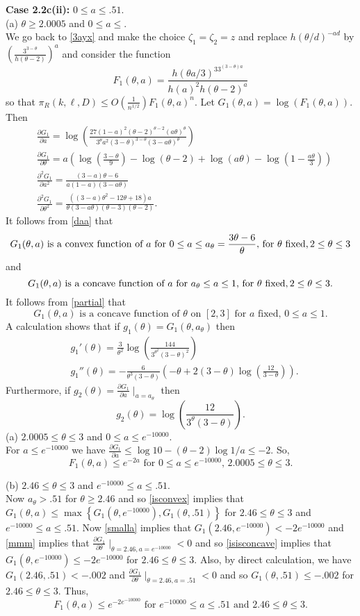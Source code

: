 \documentclass[11pt]{article}
\def\z{\zeta}
\def\th{\theta}
\def\p{\pi}
\newcommand{\set}[1]{\left\{#1\right\}}
\newcommand{\brac}[1]{\left(#1\right)}
\newcommand{\bfrac}[2]{\brac{\frac{#1}{#2}}}
\newcommand{\beq}[1]{\begin{equation}\label{#1}}
\newcommand{\eeq}{\end{equation}}
\begin{document}
{\bf Case 2.2c(ii):} $0\leq a\leq .51$.\\
(a) $\th\geq 2.0005$ and $0\leq a\leq $.\\
We go back to \eqref{3ayx} and make the choice $\z_1=\z_2=z$ and replace
$h(\th/d)^{-ad}$ by $\bfrac{3^{3-\th}}{h\brac{\th-2}}^a$ and 
consider the function 
$$F_1(\th,a)=\frac{h(\th a/3)^33^{(3-\th)a}}{h(a)^2h(\th-2)^a}$$
so that $\p_R(k,\ell,D)\leq O\bfrac{1}{n^{1/2}}F_1(\th,a)^n$. Let $G_1(\th,a)=\log(F_1(\th,a))$. Then
\begin{align}
&\frac{\partial G_1}{\partial a}=\log\bfrac{27(1-a)^2(\th-2)^{\th-2}(a\th)^\th}
{3^\th a^2(3-\th)^{3-\th}(3-a \th)^\th}\label{da}\\
&\frac{\partial G_1}{\partial\th}=a\brac{\log\bfrac{3-\th}{9}-\log(\th-2)+\log(a\th)-\log\brac{1-\frac{a\th}{3}}}\label{mmm}\\
&\frac{\partial^2G_1}{\partial a^2}=\frac{(3-a)\th-6}{a(1-a)(3-a\th)}\label{daa}\\
&\frac{\partial^2G_1}{\partial\th^2}=
\frac{((3-a)\th^2-12\th+18)a}{\th(3-a\th)(\th-3)(\th-2)}.\label{partial}\end{align}
It follows from \eqref{daa} that 
\beq{isconvex}
G_1(\th,a)\text{ is a convex function of }a\text{ for }0\leq a\leq a_\th=\frac{3\th-6}{\th},\,\text{for $\th$ fixed,\,$2\leq \th\leq 3$}
\eeq
and 
\beq{isconcave}
G_1(\th,a)\text{ is a concave function of }a\text{ for $a_\th\leq a\leq 1$},\,\text{for $\th$ fixed,\,$2\leq \th\leq 3$}. 
\eeq
It follows from \eqref{partial} that
\beq{isisconcave}
G_1(\th,a)\text{ is a concave function of $\th$ on $[2,3]$ for $a$ fixed, $0\leq a\leq 1$}. 
\eeq
A calculation shows that if $g_1(\th)=G_1(\th,a_\th)$ then
\begin{align}
&g_1'(\th)=\frac{3}{\th^2}\log\bfrac{144}{3^{\th^2}(3-\th)^2}\label{loong}\\
&g_1''(\th)=-\frac{6}{\th^3(3-\th)}\brac{-\th+2(3-\th)\log\bfrac{12}{3-\th}}.\label{long}
\end{align}
Furthermore, if $g_2(\th)=\frac{\partial G_1}{\partial a}\mid_{a=a_\th}$ then
\beq{short}
g_2(\th)=\log\bfrac{12}{3^\th(3-\th)}.
\eeq
(a) $2.0005\leq \th\leq 3$ and $0\leq a\leq e^{-10000}$.\\
For $a\leq e^{-10000}$ we have $\frac{\partial G_1}{\partial a}\leq \log 10-(\th-2)\log1/a\leq -2$. So,
\beq{smalla}
F_1(\th,a)\leq e^{-2a}\text{ for }0\leq a\leq e^{-10000},\,2.0005\leq \th\leq 3.
\eeq

(b) $2.46\leq \th\leq 3$ and $e^{-10000}\leq a\leq .51$.\\
Now $a_\th>.51$ for $\th\geq 2.46$ and so \eqref{isconvex} implies that $G_1(\th,a)\leq\max\set{G_1(\th,e^{-10000}),G_1(\th,.51)}$
for $2.46\leq \th\leq 3$ and $e^{-10000}\leq a\leq .51$.
Now \eqref{smalla} implies
that $G_1(2.46,e^{-10000})<-2e^{-10000}$ and \eqref{mmm} implies that $\frac{\partial G_1}{\partial\th}\mid_{\th=2.46,a=e^{-10000}}<0$ 
and so \eqref{isisconcave} implies that $G_1(\th,e^{-10000})\leq -2e^{-10000}$ for $2.46\leq \th\leq 3$. Also,
by direct calculation, we have
$G_1(2.46,.51)<-.002$ and $\frac{\partial G_1}{\partial\th}\mid_{\th=2.46,a=.51}<0$ and so
$G_1(\th,.51)\leq -.002$ for $2.46\leq \th\leq 3$. Thus,
$$F_1(\th,a)\leq e^{-2e^{-10000}}\text{ for }e^{-10000}\leq a\leq .51\text{ and }2.46\leq \th\leq 3.$$
\end{document}
